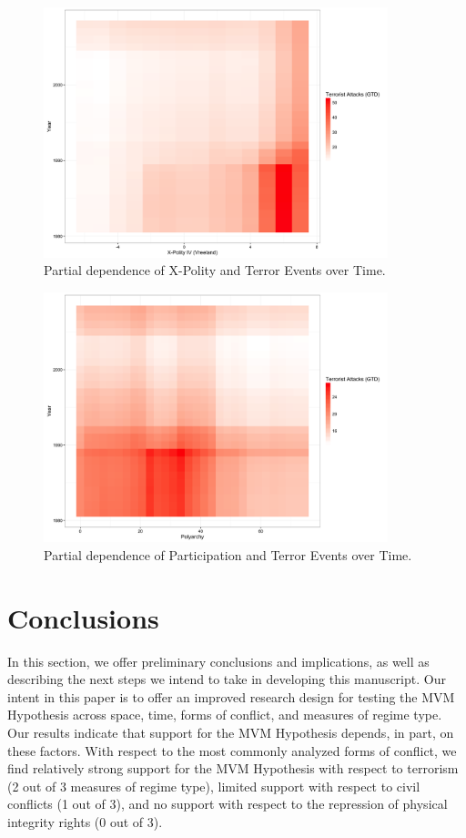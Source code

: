 \documentclass[titlepage, onecolumn,12pt]{article}
\begin{document}
\begin{figure}[h!]
\begin{center}
\includegraphics[width=100mm]{../figures/terror_events_xpolity_nas_int_year_tile.png}
\end{center}
\caption{Partial dependence of X-Polity and Terror Events over Time.}
\label{xpolity_terror}
\end{figure}

\clearpage

\begin{figure}[ht!]
\begin{center}
\includegraphics[width=100mm]{../figures/terror_events_part_int_year_tile.png}
\end{center}
\caption{Partial dependence of Participation and Terror Events over Time.}
\label{part_terror}
\end{figure}

\section{Conclusions}

In this section, we offer preliminary conclusions and implications, as well as describing the next steps we intend to take in developing this manuscript.  Our intent in this paper is to offer an improved research design for testing the MVM Hypothesis across space, time, forms of conflict, and measures of regime type. Our results indicate that support for the MVM Hypothesis depends, in part, on these factors.  With respect to the most commonly analyzed forms of conflict, we find relatively strong support for the MVM Hypothesis with respect to terrorism (2 out of 3 measures of regime type), limited support with respect to civil conflicts (1 out of 3), and no support with respect to the repression of physical integrity rights (0 out of 3).
\end{document}
